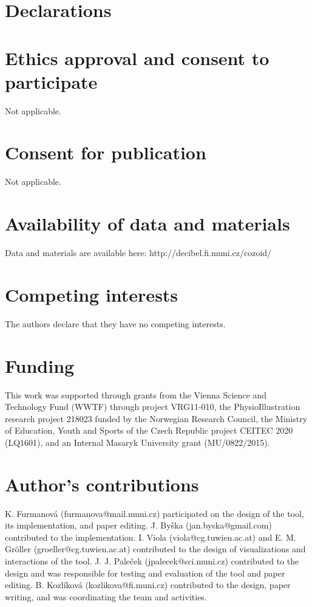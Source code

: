\documentclass{bmcart}
\begin{document}
\section*{Declarations}
\begin{backmatter}

\section*{Ethics approval and consent to participate}
Not applicable.

\section*{Consent for publication}
Not applicable.

\section*{Availability of data and materials}
Data and materials are available here: http://decibel.fi.muni.cz/cozoid/

\section*{Competing interests}
  The authors declare that they have no competing interests.
	
\section*{Funding}
This work was supported through grants from the Vienna Science and Technology Fund (WWTF) through project VRG11-010, the PhysioIllustration research project 218023 funded by the Norwegian Research Council, the Ministry of Education, Youth and Sports of the Czech Republic project CEITEC 2020 (LQ1601), and an Internal Masaryk University grant (MU/0822/2015). 

\section*{Author's contributions}
K. Furmanov\'{a} (furmanova@mail.muni.cz) participated on the design of the tool, its implementation, and paper editing.  J. By\v{s}ka (jan.byska@gmail.com) contributed to the implementation. I. Viola (viola@cg.tuwien.ac.at) and E. M. Gr\"{o}ller (groeller@cg.tuwien.ac.at) contributed to the design of visualizations and interactions of the tool. J. J. Pale\v{c}ek (jpalecek@sci.muni.cz) contributed to the design and was responsible for testing and evaluation of the tool and paper editing. B. Kozl\'{i}kov\'{a} (kozlikova@fi.muni.cz) contributed to the design, paper writing, and was coordinating the team and activities.


\end{backmatter}
\end{document}
